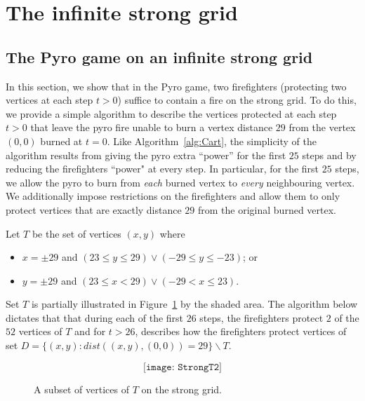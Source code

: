 \documentclass[12pt]{article}
\begin{document}
\section{The infinite strong grid}\label{sec:pyroStrong}

\subsection{The Pyro game on an infinite strong grid}\label{pyro:strong}

In this section, we show that in the Pyro game, two firefighters (protecting two vertices at each step $t>0$) suffice to contain a fire on the strong grid.  To do this, we provide a simple algorithm to describe the vertices protected at each step $t>0$ that leave the pyro fire unable to burn a vertex distance $29$ from the vertex $(0,0)$ burned at $t=0$.  Like Algorithm~\ref{alg:Cart}, the simplicity of the algorithm results from giving the pyro extra ``power'' for the first $25$ steps and by reducing the firefighters ``power" at every step.  In particular, for the first $25$ steps, we allow the pyro to burn from {\it each} burned vertex to {\it every} neighbouring vertex.  We additionally impose restrictions on the firefighters and allow them to only protect vertices that are exactly distance $29$ from the original burned vertex. 

Let $T$ be the set of vertices $(x,y)$ where \begin{itemize} \item $x= \pm 29$ and $(23 \leq y \leq 29) \vee (-29 \leq y \leq -23)$; or 

\item $y = \pm 29$ and $(23 \leq x < 29) \vee (-29 < x \leq 23)$. \end{itemize} 

Set $T$ is partially illustrated in Figure~\ref{fig:strongT} by the shaded area.  The algorithm below dictates that that during each of the first $26$ steps, the firefighters protect $2$ of the $52$ vertices of $T$ and for $t > 26$, describes how the firefighters protect vertices of set $D = \{(x,y): dist((x,y),(0,0))=29\} \backslash T$.

\begin{figure}[htbp]
\[ \texttt{[image: StrongT2]} \]
\caption{A subset of vertices of $T$ on the strong grid.} 

\label{fig:strongT}
\end{figure}
\end{document}
